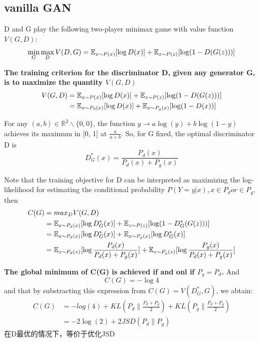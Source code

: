 \subsection{vanilla GAN}
D and G play the following two-player minimax game with value function $V(G,D)$:
\begin{equation}
    \min_G \max_D V(D, G)
    = \mathbb{E}_{x \sim P(x)}[\log D(x)] + \mathbb{E}_{z \sim P(z)}[\log (1 - D(G(z)))]
\end{equation}

\textbf{The training criterion for the discriminator D, given any generator G, is to maximize the
quantity $V(G, D)$}
\begin{equation}
    \begin{split}
        V(G, D) 
        &= \mathbb{E}_{x \sim P(x)}[\log D(x)] + \mathbb{E}_{z \sim P(z)}[\log (1 - D(G(z)))] \\
        &= \mathbb{E}_{x \sim P_d(x)}[\log D(x)] + \mathbb{E}_{x \sim P_g(x)}[\log (1 - D(x))]
    \end{split}
\end{equation}

For any $(a, b) \in \mathbb{R}^2 \backslash \{0, 0\}$, the function $ y \to a\log(y) + b\log(1 - y)$
achieves its maximum in [0, 1] at $\frac{a}{a + b}$.
So, for G fixed, the optimal discriminator D is
\begin{equation}
    D_{G}^{*}(x) = \frac{P_d(x)}{P_d(x) + P_g(x)}
\end{equation}

Note that the training objective for D can be interpreted as maximizing the log-likelihood for
estimating the conditional probability $P(Y = y|x), x \in P_d or \in P_g$, then
\begin{equation}
    \begin{split}
        C(G) &= max_D V(G, D) \\
        &= \mathbb{E}_{x \sim P_d(x)}[\log D_G^*(x)] + \mathbb{E}_{z \sim P(z)}[\log(1 - D_G^*(G(z)))] \\
        &= \mathbb{E}_{x \sim P_d(x)}[\log D_G^*(x)] + \mathbb{E}_{x \sim P_g(x)}[\log D_G^*(x)] \\
        &= \mathbb{E}_{x \sim P_d(x)}[\log \frac{P_d(x)}{P_d(x) + P_g(x)}] + \mathbb{E}_{x \sim P_g(x)}[\log \frac{P_g(x)}{P_d(x) + P_g(x)}]
    \end{split}
\end{equation}

\textbf{The global minimum of C(G) is achieved if and onl if $P_g = P_d$.} And
\begin{equation}
    C(G) = - \log 4
\end{equation}
and that by substracting this expression from $C(G) = V(D_G^*, G)$, we abtain:
\begin{equation}
    \begin{split}
        C(G) &= -log(4) + KL(P_d\| \frac{P_d + P_g}{2}) + KL(P_g \| \frac{P_d + P_g}{2}) \\
        &= -2\log(2) + 2JSD(P_d\|P_g)
    \end{split}
\end{equation}
在D最优的情况下，等价于优化JSD

